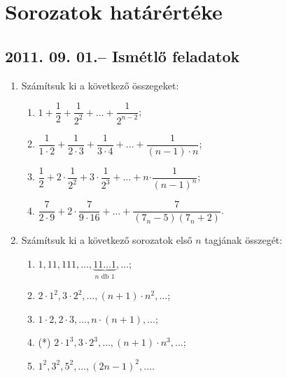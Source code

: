 \documentclass{article}
\newenvironment{abc}{\begin{enumerate}[label=\textit{\alph*})]}{\end{enumerate}}
\begin{document}
\section*{Sorozatok határértéke}

\subsection*{2011. 09. 01.-- Ismétlő feladatok}
\begin{enumerate}
\item Számítsuk ki a következő összegeket:
	\begin{abc}
	\item $1+\dfrac{1}{2}+\dfrac{1}{2^2}+\ldots+\dfrac{1}{2^{n-2}}$;
	\item $\dfrac{1}{1\cdot2}+\dfrac{1}{2\cdot3}+\dfrac{1}{3\cdot4}+\ldots+\dfrac{1}{(n-1)\cdot n}$;
    \item $\dfrac{1}{2}+2\cdot{\dfrac{1}{2^2}}+3\cdot{\dfrac{1}{2^3}}+\ldots+n{\cdot\dfrac{1}{(n-1)^n}}$;
     \item $\dfrac{7}{2\cdot9}+2\cdot\dfrac{7}{9\cdot16}+\ldots+\dfrac{7}{(7_n-5)(7_n+2)}$.
    \end{abc}
\item Számítsuk ki a következő sorozatok első $n$ tagjának összegét:
	\begin{abc}
    \item $1, 11, 111, \ldots, \underbrace{11\ldots 1}_{\text{$n$ db $1$}},\ldots$;
    \item $2\cdot1^2, 3\cdot2^2, \ldots, (n+1)\cdot{n^2}, \ldots$;
    \item $1\cdot2, 2\cdot3, \ldots, n\cdot(n+1), \ldots$;
    \item (*) $2\cdot1^3, 3\cdot2^3, \ldots, (n+1)\cdot{n^3}, \ldots$;
    \item $1^2, 3^2, 5^2, \ldots, (2n-1)^2, \ldots$.
    \end{abc}
    
\end{enumerate}
\end{document}
